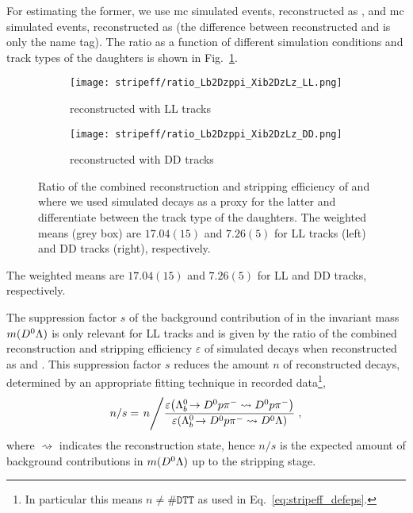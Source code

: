 For estimating the former, we use \gls{mc} simulated \decay{\Lb}{\Dz\proton\pim} events, reconstructed as \decay{\Lb}{\Dz\proton\pim}, and \gls{mc} simulated \decay{\Xib}{\Dz\Lz} events, reconstructed as \decay{\Lb}{\Dz\Lz} (the difference between reconstructed \Lb and \Xib is only the name tag).
The ratio as a function of different simulation conditions and track types of the \Lz daughters is shown in Fig.~\ref{fig:stripeff_Dzppi_vs_DzLz}.
\begin{figure}[htbp]
    \centering
    \begin{subfigure}{.49\textwidth}
        \centering
        \texttt{[image: stripeff/ratio\_Lb2Dzppi\_Xib2DzLz\_LL.png]}
        \caption{\Lz reconstructed with \gls{LL} tracks}
    \end{subfigure}
    \begin{subfigure}{.49\textwidth}
        \centering
        \texttt{[image: stripeff/ratio\_Lb2Dzppi\_Xib2DzLz\_DD.png]}
        \caption{\Lz reconstructed with \gls{DD} tracks}
    \end{subfigure}
    \caption{Ratio of the combined reconstruction and \gls{stripping} efficiency of \decay{\Lb}{\Dz\proton\pim} and \decay{\Lb}{\Dz\Lz} where we used \decay{\Xib}{\Dz\Lz} simulated decays as a proxy for the latter and differentiate between the track type of the \Lz daughters. The weighted means (grey box) are $17.04(15)$ and $7.26(5)$ for \gls{LL} tracks (left) and \gls{DD} tracks (right), respectively.}
    \label{fig:stripeff_Dzppi_vs_DzLz}
\end{figure}
The weighted means are $17.04(15)$ and $7.26(5)$ for \gls{LL} and \gls{DD} tracks, respectively.

The suppression factor $s$ of the background contribution of \decay{\Lb}{\Dz\proton\pim} in the invariant mass $m({{D}^0}{\Lambda})$ is only relevant for \gls{LL} tracks and is given by the ratio of the combined reconstruction and \gls{stripping} efficiency $\varepsilon$ of simulated \decay{\Lb}{\Dz\proton\pim} decays when reconstructed as \Dz\proton\pim and \Dz\Lz.
This suppression factor $s$ reduces the amount $n$ of reconstructed \decay{\Lb}{\Dz\proton\pim} decays, determined by an appropriate fitting technique in recorded data\footnote{In particular this means $n \neq \texttt{\#DTT}$ as used in Eq.~\eqref{eq:stripeff_defeps}.},
\begin{equation*}
    n / s = \left. n \middle/ \frac{\varepsilon\!\left( {{\Lambda}^0_{b}}\!\rightarrow {\ensuremath{{D}^0}}{\ensuremath{p}}{\ensuremath{{\pi}^-}} \rightsquigarrow {\ensuremath{{D}^0}}{\ensuremath{p}}{\ensuremath{{\pi}^-}} \right)}{\varepsilon\!\left( {{\Lambda}^0_{b}}\!\rightarrow {\ensuremath{{D}^0}}{\ensuremath{p}}{\ensuremath{{\pi}^-}} \rightsquigarrow {\ensuremath{{D}^0}}{\ensuremath{\Lambda}} \right)} \right.,
\end{equation*}
where $\rightsquigarrow$ indicates the reconstruction state, hence $n/s$ is the expected amount of background contributions in $m({{D}^0}{\Lambda})$ up to the \gls{stripping} stage.

